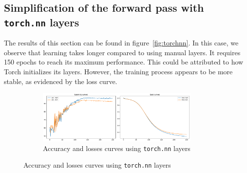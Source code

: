 \subsection{Simplification of the forward pass with \texttt{torch.nn} layers}

The results of this section can be found in figure~\ref{fig:torchnn}. In this case, we observe that learning takes longer compared to using manual layers. It requires 150 epochs to reach its maximum performance. This could be attributed to how Torch initializes its layers. However, the training process appears to be more stable, as evidenced by the loss curve.

\begin{figure}[H]
    \centering
    \begin{subfigure}{\textwidth}
        \centering
        \includegraphics[width=0.88\textwidth]{figs/NN/torchnn_acc_loss.pdf}
        \caption{Accuracy and losses curves using \texttt{torch.nn} layers}
        \label{subfig:torchnn_acc_loss}
    \end{subfigure}
\end{figure}

